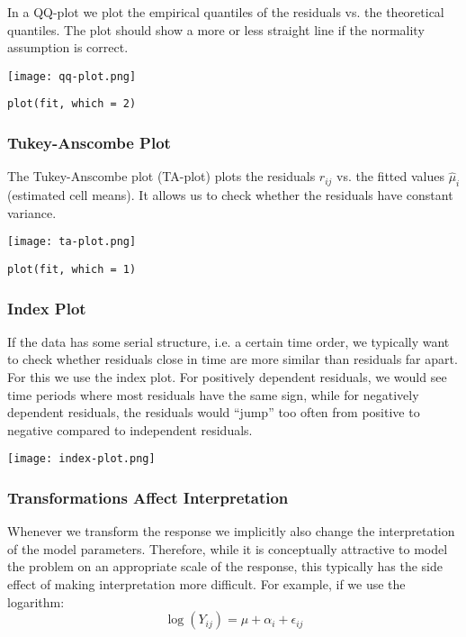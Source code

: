 In a QQ-plot we plot the empirical quantiles of the residuals vs. the theoretical quantiles. The plot should show a more or less straight line if the normality assumption is correct.
\\[-20pt]
\begin{center}
	\texttt{[image: qq-plot.png]}
\end{center}
\begin{lstlisting}
plot(fit, which = 2)
\end{lstlisting}

\subsubsection{Tukey-Anscombe Plot}

The Tukey-Anscombe plot (TA-plot) plots the residuals $r_{ij}$ vs. the fitted values $\hat \mu_i$ (estimated cell means). It allows us to check whether the residuals have constant variance.
\begin{center}
	\texttt{[image: ta-plot.png]}
\end{center}
\begin{lstlisting}
plot(fit, which = 1)
\end{lstlisting}

\subsubsection{Index Plot}

If the data has some serial structure, i.e. a certain time order, we typically want to check whether residuals close in time are more similar than residuals far apart. For this we use the index plot. For positively dependent residuals, we would see time periods where most residuals have the same sign, while for negatively dependent residuals, the residuals would “jump” too often from positive to negative compared to independent residuals. 
\begin{center}
	\texttt{[image: index-plot.png]}
\end{center}


\subsubsection{Transformations Affect Interpretation}

Whenever we transform the response we implicitly also change the interpretation of the model parameters. Therefore, while it is conceptually attractive to model the problem on an appropriate scale of the response, this typically has the side effect of making interpretation more difficult. For example, if we use the logarithm:
$$\log (Y_{ij}) = \mu + \alpha_i + \epsilon_{ij}$$

